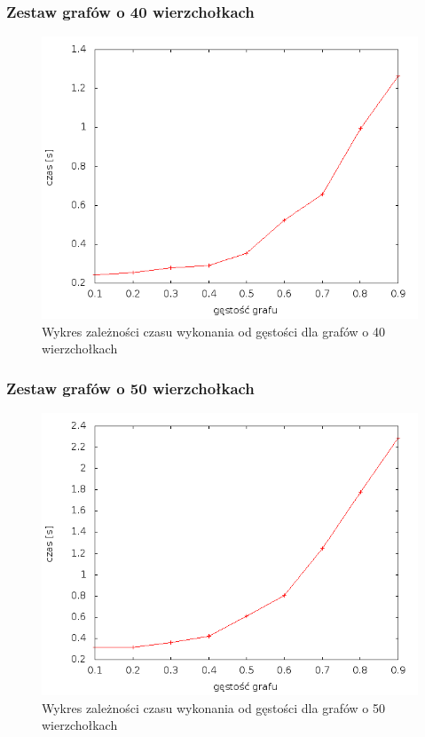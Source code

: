 \documentclass[12pt, a4paper]{article}
\begin{document}
\subsubsection*{Zestaw grafów o 40 wierzchołkach}
\begin{figure}[!h]
    \begin{center}
	\includegraphics[scale=0.5]{results/img/dim/dim_40.png}
	\caption{Wykres zależności czasu wykonania od gęstości dla grafów o 40 wierzchołkach}
    \end{center}
\end{figure}
\FloatBarrier
\newpage
\subsubsection*{Zestaw grafów o 50 wierzchołkach}
\begin{figure}[!h]
    \begin{center}
	\includegraphics[scale=0.5]{results/img/dim/dim_50.png}
	\caption{Wykres zależności czasu wykonania od gęstości dla grafów o 50 wierzchołkach}
    \end{center}
\end{figure}
\FloatBarrier
\end{document}
